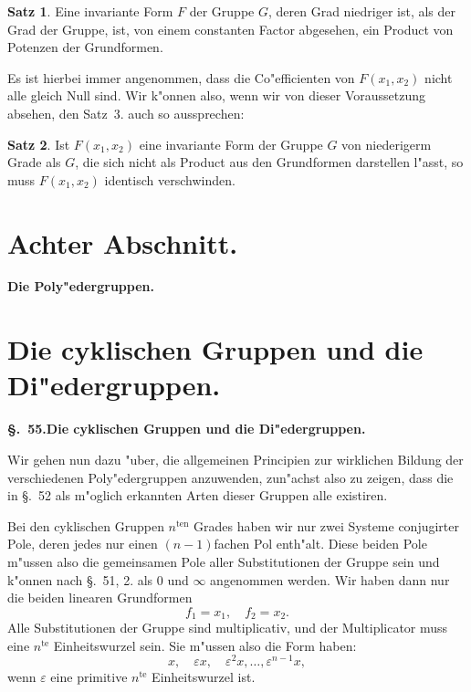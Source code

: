 \documentclass[12pt,a4paper]{article}
\theoremstyle{definition}
\newtheorem*{satz}{Satz}
\begin{document}
\begin{satz}
Eine invariante Form $F$ der Gruppe $G$, deren Grad niedriger ist, als der Grad der Gruppe, ist, von einem constanten Factor abgesehen, ein Product von Potenzen der Grundformen.
\end{satz}

Es ist hierbei immer angenommen, dass die Co"efficienten von $F(x_1, x_2)$ nicht alle gleich Null sind. Wir k"onnen also, wenn wir von dieser Voraussetzung absehen, den Satz~3. auch so aussprechen:

\begin{satz}
Ist $F(x_1, x_2)$ eine invariante Form der Gruppe $G$ von niederigerm Grade als $G$, die sich nicht als Product aus den Grundformen darstellen l"asst, so muss $F(x_1, x_2)$ identisch verschwinden.
\end{satz}


\newpage
\section*{Achter Abschnitt.}

\begin{center}
\Large\textbf{Die Poly"edergruppen.}
\end{center}

\section{Die cyklischen Gruppen und die Di"edergruppen.}\label{sec:55}

\noindent\textbf{\S.~55.}\quad\textbf{Die cyklischen Gruppen und die Di"edergruppen.}
\vspace{0.3cm}

Wir gehen nun dazu "uber, die allgemeinen Principien zur wirklichen Bildung der verschiedenen Poly"edergruppen anzuwenden, zun"achst also zu zeigen, dass die in \S.~52 als m"oglich erkannten Arten dieser Gruppen alle existiren.

Bei den cyklischen Gruppen $n^{\text{ten}}$ Grades haben wir nur zwei Systeme conjugirter Pole, deren jedes nur einen $(n-1)$fachen Pol enth"alt. Diese beiden Pole m"ussen also die gemeinsamen Pole aller Substitutionen der Gruppe sein und k"onnen nach \S.~51, 2. als $0$ und $\infty$ angenommen werden. Wir haben dann nur die beiden linearen Grundformen
\begin{equation}\label{eq:55-1}
f_1 = x_1, \quad f_2 = x_2.
\end{equation}
Alle Substitutionen der Gruppe sind multiplicativ, und der Multiplicator muss eine $n^{\text{te}}$ Einheitswurzel sein. Sie m"ussen also die Form haben:
\begin{equation}\label{eq:55-2}
x, \quad \varepsilon x, \quad \varepsilon^2 x, \ldots, \varepsilon^{n-1} x,
\end{equation}
wenn $\varepsilon$ eine primitive $n^{\text{te}}$ Einheitswurzel ist.
\end{document}
